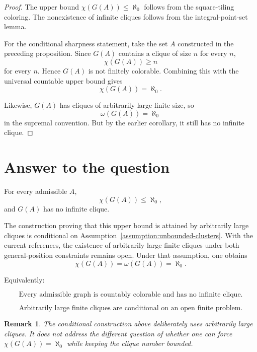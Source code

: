 \documentclass[11pt]{article}
\newtheorem{remark}{Remark}
\begin{document}
\begin{proof}
The upper bound \(\chi(G(A))\leq \aleph_0\) follows from the square-tiling coloring. The nonexistence of infinite cliques follows from the integral-point-set lemma.

For the conditional sharpness statement, take the set \(A\) constructed in the preceding proposition. Since \(G(A)\) contains a clique of size \(n\) for every \(n\),
\[
\chi(G(A))\geq n
\]
for every \(n\). Hence \(G(A)\) is not finitely colorable. Combining this with the universal countable upper bound gives
\[
\chi(G(A))=\aleph_0.
\]

Likewise, \(G(A)\) has cliques of arbitrarily large finite size, so
\[
\omega(G(A))=\aleph_0
\]
in the supremal convention. But by the earlier corollary, it still has no infinite clique.
\end{proof}

\section{Answer to the question}

For every admissible \(A\),
\[
\chi(G(A))\leq \aleph_0,
\]
and \(G(A)\) has no infinite clique.

The construction proving that this upper bound is attained by arbitrarily large cliques is conditional on Assumption~\ref{assumption:unbounded-clusters}. With the current references, the existence of arbitrarily large finite cliques under both general-position constraints remains open. Under that assumption, one obtains
\[
\chi(G(A))=\omega(G(A))=
\aleph_0.
\]

Equivalently:

\[
\boxed{\text{Every admissible graph is countably colorable and has no infinite clique.}}
\]

\[
\boxed{\text{Arbitrarily large finite cliques are conditional on an open finite problem.}}
\]

\begin{remark}
The conditional construction above deliberately uses arbitrarily large cliques. It does not address the different question of whether one can force \(\chi(G(A))=\aleph_0\) while keeping the clique number bounded.
\end{remark}
\end{document}
